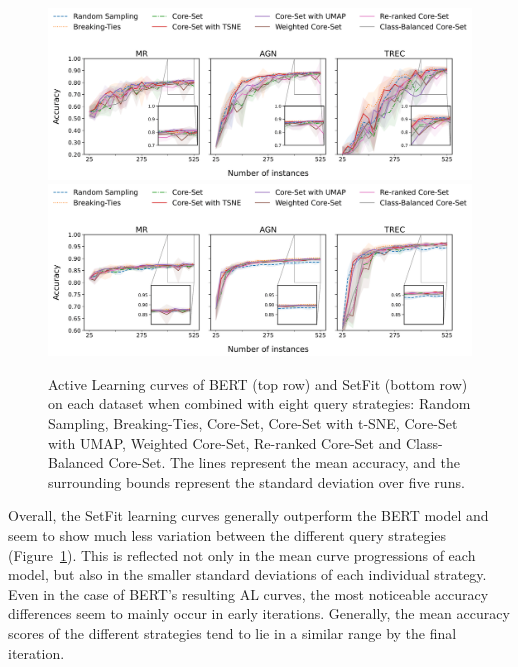 \documentclass[english,bachelor,ul]{webisthesis} %
\begin{document}
\begin{figure}[t]
    \centering
    \includegraphics[width=1\textwidth,trim={0 1.1cm 0 0},clip]{img/bert-plots-1.png}
    \includegraphics[width=1\textwidth,trim={0 0 0 4.83cm},clip]{img/setfit-plots-1.png}
    \caption{Active Learning curves of BERT (top row) and SetFit (bottom row) on each dataset when combined with eight query strategies: Random Sampling, Breaking-Ties, Core-Set, Core-Set with t-SNE, Core-Set with UMAP, Weighted Core-Set, Re-ranked Core-Set and Class-Balanced Core-Set. The lines represent the mean accuracy, and the surrounding bounds represent the standard deviation over five runs.}
    \label{fig:learning-curves}
\end{figure}

Overall, the SetFit learning curves generally outperform the BERT model and seem to show much less variation between the different query strategies (Figure~\ref{fig:learning-curves}). This is reflected not only in the mean curve progressions of each model, but also in the smaller standard deviations of each individual strategy. Even in the case of BERT's resulting AL curves, the most noticeable accuracy differences seem to mainly occur in early iterations. Generally, the mean accuracy scores of the different strategies tend to lie in a similar range by the final iteration. 
\end{document}
